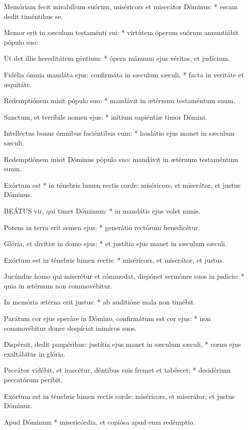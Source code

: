 Memóriam fecit mirabílium suórum, miséricors et miserátor Dóminus: * escam dedit timéntibus se.

Memor erit in sæculum testaménti sui: * virtútem óperum suórum annuntiábit pópulo suo:

Ut det illis hereditátem géntium: * ópera mánuum ejus véritas, et judícium.

Fidélia ómnia mandáta ejus: confirmáta in sæculum sæculi, * facta in veritáte et æquitáte.

Redemptiónem misit pópulo suo: * mandávit in ætérnum testaméntum suum.

Sanctum, et terríbile nomen ejus: * inítium sapiéntiæ timor Dómini.

Intelléctus bonus ómnibus faciéntibus eum: * laudátio ejus manet in sæculum sæculi.

 Redemptiónem misit Dóminus pópulo suo: mandávit in ætérnum testaméntum suum.

 Exórtum est * in ténebris lumen rectis corde: miséricors, et miserátor, et justus Dóminus.


\lettrine[lines=2]{B}{EÁTUS} vir, qui timet Dóminum: * in mandátis ejus volet nimis.

Potens in terra erit semen ejus: * generátio rectórum benedicétur.

Glória, et divítiæ in domo ejus: * et justítia ejus manet in sæculum sæculi.

Exórtum est in ténebris lumen rectis: * miséricors, et miserátor, et justus.

Jucúndus homo qui miserétur et cómmodat, dispónet sermónes suos in judício: * quia in ætérnum non commovébitur.

In memória ætérna erit justus: * ab auditióne mala non timébit.

Parátum cor ejus speráre in Dómino, confirmátum est cor ejus: * non commovébitur donec despíciat inimícos suos.

Dispérsit, dedit paupéribus: justítia ejus manet in sæculum sæculi, * cornu ejus exaltábitur in glória.

Peccátor vidébit, et irascétur, déntibus suis fremet et tabéscet: * desidérium peccatórum períbit.

 Exórtum est in ténebris lumen rectis corde: miséricors, et miserátor, et justus Dóminus.

 Apud Dóminum * misericórdia, et copiósa apud eum redémptio.


